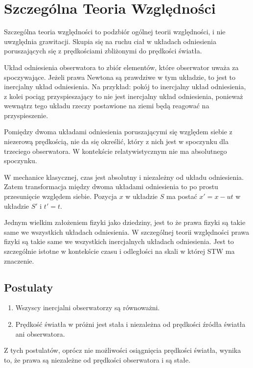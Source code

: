 \documentclass{../notatki}
\begin{document}
\section{Szczególna Teoria Względności}

Szczególna teoria względności to podzbiór ogólnej teorii względności, i nie
uwzględnia grawitacji. Skupia się na ruchu ciał w układach odniesienia
poruszających się z prędkościami zbliżonymi do prędkości światła.

Układ odniesienia obserwatora to zbiór elementów, które obserwator uważa za
spoczywające. Jeżeli prawa Newtona są prawdziwe w tym układzie, to jest to
inercjalny układ odniesienia. Na przykład: pokój to inercjalny układ
odniesienia, z kolei pociąg przyspieszający to nie jest inercjalny układ
odniesienia, ponieważ wewnątrz tego układu rzeczy postawione na ziemi będą
reagować na przyspieszenie.

Pomiędzy dwoma układami odniesienia poruszającymi się względem siebie
z niezerową prędkością, nie da się określić, który z nich jest w spoczynku dla
trzeciego obserwatora. W kontekście relatywistycznym nie ma absolutnego
spoczynku.

W mechanice klasycznej, czas jest absolutny i niezależny od układu odniesienia.
Zatem transformacja między dwoma układami odniesienia to po prostu przesunięcie
względem siebie. Pozycja $x$ w układzie $S$ ma postać $x' = x - ut$ w
układzie $S'$ i $t' = t$.

Jednym wielkim założeniem fizyki jako dziedziny, jest to że prawa fizyki są
takie same we wszystkich układach odniesienia. W szczególnej teorii względności
prawa fizyki są takie same we wszystkich inercjalnych układach odniesienia.
Jest to szczególnie istotne w kontekście czasu i odległości na skali w której
STW ma znaczenie.

\subsection{Postulaty}

\begin{enumerate}
  \item Wszyscy inercjalni obserwatorzy są równoważni.
  \item Prędkość światła w próżni jest stała i niezależna od prędkości
    źródła światła ani obserwatora.
\end{enumerate}

Z tych postulatów, oprócz nie możliwości osiągnięcia prędkości światła, wynika
to, że prawa są niezależne od prędkości obserwatora i są stałe.
\end{document}
